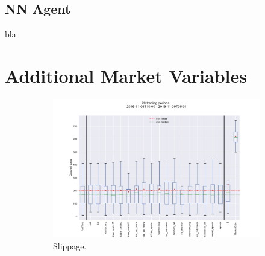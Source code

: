 \subsection{NN Agent}
bla



\section{Additional Market Variables}
\label{chap:exp:additionalmarketvars}





\begin{figure}[ht]
	\centering
	
	\begin{subfigure}[b]{0.6\textwidth}
        		\centering
        		\includegraphics[width=\textwidth]{content/drawings/slippage_additionalMarketVars}
        		\caption{Slippage.}
		\label{fig:eval:additionalMarketVariables:plot}
    	\end{subfigure}%
	\begin{subfigure}[b]{0.25\textwidth}
        		\centering
\end{subfigure}
\end{figure}
